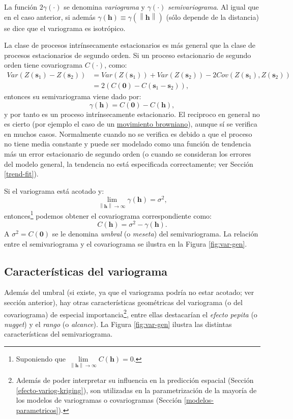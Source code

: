 \documentclass[
  spanish,
]{book}
\theoremstyle{break}
\theoremstyle{definition}
\theoremstyle{definition}
\theoremstyle{definition}
\theoremstyle{definition}
\theoremstyle{remark}
\begin{document}
La función \(2\gamma (\cdot)\) se denomina \emph{variograma} y \(\gamma (\cdot)\) \emph{semivariograma}.
Al igual que en el caso anterior, si además \(\gamma(\mathbf{h}) \equiv \gamma(\left\| \mathbf{h}\right\|)\) (sólo depende de la distancia) se dice que el variograma es isotrópico.

La clase de procesos intrínsecamente estacionarios es más general que la clase de procesos estacionarios de segundo orden.
Si un proceso estacionario de segundo orden tiene covariograma \(C(\cdot)\), como:
\[\begin{aligned}
Var(Z(\mathbf{s}_1)-Z(\mathbf{s}_2)) &= Var(Z(\mathbf{s}_1)) + Var(Z(\mathbf{s}_2))-2Cov(Z(\mathbf{s}_1),Z(\mathbf{s}_2)) \\
&=2\left(C(\mathbf{0})-C(\mathbf{s}_1 -\mathbf{s}_2)\right),
\end{aligned}\]
entonces su semivariograma viene dado por:
\[\gamma (\mathbf{h}) = C(\mathbf{0})-C(\mathbf{h}),\]
y por tanto es un proceso intrínsecamente estacionario.
El reciproco en general no es cierto (por ejemplo el caso de un \href{https://es.wikipedia.org/wiki/Movimiento_browniano\#Matem\%C3\%A1ticas}{movimiento browniano}), aunque sí se verifica en muchos casos.
Normalmente cuando no se verifica es debido a que el proceso no tiene media constante y puede ser modelado como una función de tendencia más un error estacionario de segundo orden (o cuando se consideran los errores del modelo general, la tendencia no está especificada correctamente; ver Sección \ref{trend-fit}).

Si el variograma está acotado y:
\[\lim \limits_{\left\| \mathbf{h}\right\| \rightarrow \infty }\gamma(\mathbf{h})=\sigma^2,\]
entonces\footnote{Suponiendo que \(\lim \limits_{\left\| \mathbf{h}\right\| \rightarrow \infty } C(\mathbf{h})=0\).} podemos obtener el covariograma correspondiente como:
\[C(\mathbf{h})=\sigma^2-\gamma (\mathbf{h}).\]
A \(\sigma^{2} = C(\mathbf{0})\) se le denomina \emph{umbral} (o \emph{meseta}) del semivariograma.
La relación entre el semivariograma y el covariograma se ilustra en la Figura \ref{fig:var-gen}.

\hypertarget{caracteristicas-variograma}{%
\subsection{Características del variograma}\label{caracteristicas-variograma}}

Además del umbral (si existe, ya que el variograma podría no estar acotado; ver sección anterior), hay otras características geométricas del variograma (o del covariograma) de especial importancia\footnote{Además de poder interpretar su influencia en la predicción espacial (Sección \ref{efecto-variog-kriging}), son utilizadas en la parametrización de la mayoría de los modelos de variogramas o covariogramas (Sección \ref{modelos-parametricos}).}, entre ellas destacarían el \emph{efecto pepita} (o \emph{nugget}) y el \emph{rango} (o \emph{alcance}).
La Figura \ref{fig:var-gen} ilustra las distintas características del semivariograma.
\end{document}
